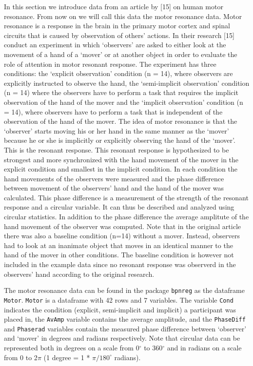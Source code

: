 \documentclass[11pt,]{article}
\begin{document}
In this section we introduce data from an article by {[}15{]} on human
motor resonance. From now on we will call this data the motor resonance
data. Motor resonance is a response in the brain in the primary motor
cortex and spinal circuits that is caused by observation of others'
actions. In their research {[}15{]} conduct an experiment in which
`observers' are asked to either look at the movement of a hand of a
`mover' or at another object in order to evaluate the role of attention
in motor resonant response. The experiment has three conditions: the
`explicit observation' condition (n = 14), where observers are
explicitly instructed to observe the hand, the `semi-implicit
observation' condition (n = 14) where the observers have to perform a
task that requires the implicit observation of the hand of the mover and
the `implicit observation' condition (n = 14), where observers have to
perform a task that is independent of the observation of the hand of the
mover. The idea of motor resonance is that the `observer' starts moving
his or her hand in the same manner as the `mover' because he or she is
implicitly or explicitly observing the hand of the `mover'. This is the
resonant response. This resonant response is hypothesized to be
strongest and more synchronized with the hand movement of the mover in
the explicit condition and smallest in the implicit condition. In each
condition the hand movements of the observers were measured and the
phase difference between movement of the observers' hand and the hand of
the mover was calculated. This phase difference is a measurement of the
strength of the resonant response and a circular variable. It can thus
be described and analyzed using circular statistics. In addition to the
phase difference the average amplitute of the hand movement of the
observer was computed. Note that in the original article there was also
a baseline condition (n=14) without a mover. Instead, observers had to
look at an inanimate object that moves in an identical manner to the
hand of the mover in other conditions. The baseline condition is however
not included in the example data since no resonant response was
observerd in the observers' hand according to the original research.

The motor resonance data can be found in the package \verb|bpnreg| as
the dataframe \verb|Motor|. \verb|Motor| is a dataframe with 42 rows and
7 variables. The variable \verb|Cond| indicates the condition (explicit,
semi-implicit and implicit) a participant was placed in, the
\verb|AvAmp| variable contains the average amplitude, and the
\verb|PhaseDiff| and \verb|Phaserad| variables contain the measured
phase difference between `observer' and `mover' in degrees and radians
respectively. Note that circular data can be represented both in degrees
on a scale from 0\(^\circ\) to 360\(^\circ\) and in radians on a scale
from 0 to 2\(\pi\) (1 degree = 1 * \(\pi/180^\circ\) radians).
\end{document}
